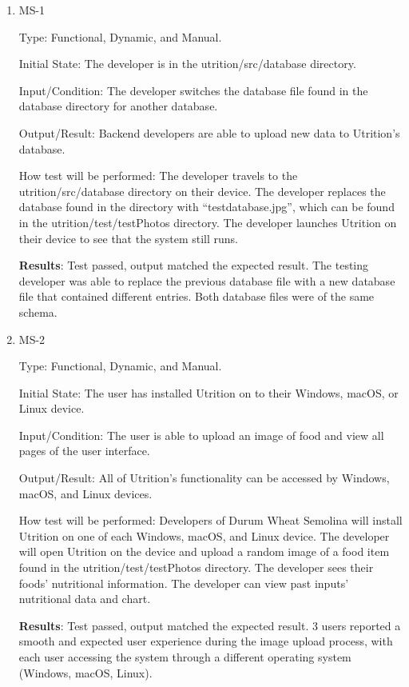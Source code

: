 \documentclass[12pt, titlepage]{article}
\begin{document}
	\begin{enumerate}
		
		\item{MS-1} 
		
		Type: Functional, Dynamic, and Manual.
		
		Initial State: The developer is in the utrition/src/database directory.
		
		Input/Condition: The developer switches the database file found in the database directory for another database.
		
		Output/Result: Backend developers are able to upload new data to Utrition’s database.
		
		How test will be performed: The developer travels to the utrition/src/database directory on their device. The developer replaces the database found in the directory with “testdatabase.jpg”, which can be found in the utrition/test/testPhotos directory. The developer launches Utrition on their device to see that the system still runs.	
		
		\textbf{Results}: Test passed, output matched the expected result. The testing developer was able to replace the previous database file with a new database file that contained different entries. Both database files were of the same schema.
		
		\item{MS-2} 
		
		Type: Functional, Dynamic, and Manual.
		
		Initial State: The user has installed Utrition on to their Windows, macOS, or Linux device.
		
		Input/Condition: The user is able to upload an image of food and view all pages of the user interface.
		
		Output/Result: All of Utrition’s functionality can be accessed by Windows, macOS, and Linux devices.
		
		How test will be performed: Developers of Durum Wheat Semolina will install Utrition on one of each Windows, macOS, and Linux device. The developer will open Utrition on the device and upload a random image of a food item found in the utrition/test/testPhotos directory. The developer sees their foods’ nutritional information. The developer can view past inputs' nutritional data and chart.
		
		\textbf{Results}: Test passed, output matched the expected result. 3 users reported a smooth and expected user experience during the image upload process, with each user accessing the system through a different operating system (Windows, macOS, Linux).
		
	\end{enumerate}
	
\end{document}

